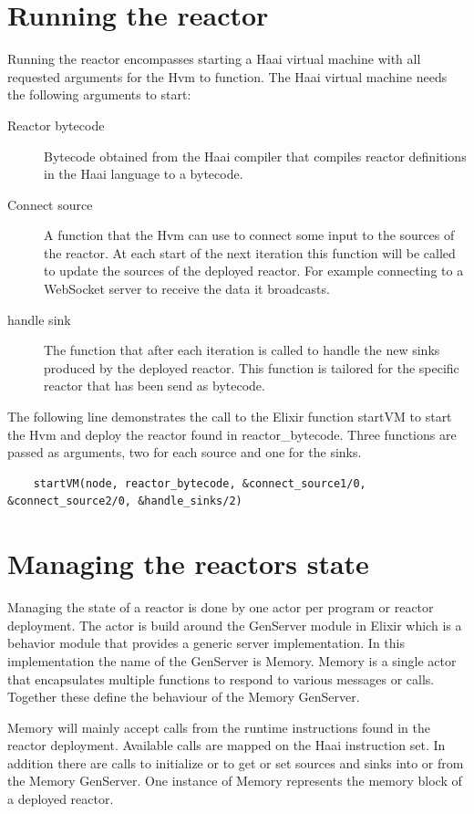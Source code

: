 \documentclass[a4paper]{book}
\begin{document}
\section{Running the reactor}
Running the reactor encompasses starting a Haai virtual machine with all requested arguments for the Hvm to function. The Haai virtual machine needs the following arguments to start: 
\begin{description}
	\item[Reactor bytecode] Bytecode obtained from the Haai compiler that compiles reactor definitions in the Haai language to a bytecode.
	\item[Connect source] A function that the Hvm can use to connect some input to the sources of the reactor. At each start of the next iteration this function will be called to update the sources of the deployed reactor. For example connecting to a WebSocket server to receive the data it broadcasts.
	\item[handle sink] The function that after each iteration is called to handle the new sinks produced by the deployed reactor. This function is tailored for the specific reactor that has been send as bytecode.
\end{description}
	
\noindent 
The following line demonstrates the call to the Elixir function startVM to start the Hvm and deploy the reactor found in reactor\_bytecode. Three functions are passed as arguments, two for each source and one for the sinks.

\begin{verbatim}
	startVM(node, reactor_bytecode, &connect_source1/0, &connect_source2/0, &handle_sinks/2)
\end{verbatim}

\section{Managing the reactors state}
Managing the state of a reactor is done by one actor per program or reactor deployment. The actor is build around the GenServer module in Elixir which is a behavior module that provides a generic server implementation. In this implementation the name of the GenServer is Memory. Memory is a single actor that encapsulates multiple functions to respond to various messages or calls. Together these define the behaviour of the Memory GenServer.

Memory will mainly accept calls from the runtime instructions found in the reactor deployment. Available calls are mapped on the Haai instruction set. In addition there are calls to initialize or to get or set sources and sinks into or from the Memory GenServer. One instance of Memory represents the memory block of a deployed reactor.
\end{document}
